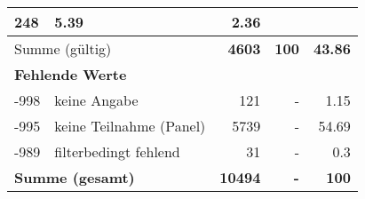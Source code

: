 \begin{longtable}{lXrrr}
       \num{248} &
       \num[round-mode=places,round-precision=2]{5.39} &
         \num[round-mode=places,round-precision=2]{2.36} \\
     \midrule
     \multicolumn{2}{l}{Summe (gültig)} &
       \textbf{\num{4603}} &
     \textbf{\num{100}} &
       \textbf{\num[round-mode=places,round-precision=2]{43.86}} \\
     \multicolumn{5}{l}{\textbf{Fehlende Werte}}\\
       -998 &
       keine Angabe &
         \num{121} &
        - &
         \num[round-mode=places,round-precision=2]{1.15} \\
       -995 &
       keine Teilnahme (Panel) &
         \num{5739} &
        - &
         \num[round-mode=places,round-precision=2]{54.69} \\
       -989 &
       filterbedingt fehlend &
         \num{31} &
        - &
         \num[round-mode=places,round-precision=2]{0.3} \\
     \midrule
     \multicolumn{2}{l}{\textbf{Summe (gesamt)}} &
          \textbf{\num{10494}} &
        \textbf{-} &
        \textbf{\num{100}} \\
     \bottomrule
     \end{longtable}
     

